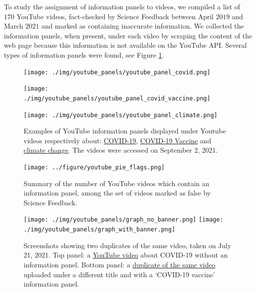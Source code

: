 \documentclass[Afour,sageh,times]{sagej}
\begin{document}
To study the assignment of information panels to videos, we compiled a list of $170$ YouTube videos, fact-checked by Science Feedback between April $2019$ and March $2021$ and marked as containing inaccurate information. 
We collected the information panels, when present, under each video by scraping the content of the web page because this information is not available on the YouTube API. 
Several types of information panels were found, see Figure \ref{youtube_panel_screenshots}.

\begin{figure}[h]
	\centering
		\texttt{[image: ./img/youtube\_panels/youtube\_panel\_covid.png]} \vspace{0.3cm}
		
		\texttt{[image: ./img/youtube\_panels/youtube\_panel\_covid\_vaccine.png]} 
		\vspace{0.3cm}
		
		\texttt{[image: ./img/youtube\_panels/youtube\_panel\_climate.png]}
	\caption{Examples of YouTube information panels displayed under Youtube videos respectively about: \href{https://www.youtube.com/watch?v=O1cFVdC2rZQ}{COVID-19}, \href{https://www.youtube.com/watch?v=v0-6JTr2Ifo}{COVID-19 Vaccine} and \href{https://www.youtube.com/watch?v=4U8kgiiVj5Q}{climate change}. The videos were accessed on September 2, 2021.}
	\label{youtube_panel_screenshots}
\end{figure}

\begin{figure}[h]
	\centering
		\texttt{[image: ../figure/youtube\_pie\_flags.png]}
		\caption{Summary of the number of YouTube videos which contain an information panel, among the set of videos marked as false by Science Feedback.}
\label{youtube_panel_proportions}
\end{figure}

\begin{figure}[h]
	\centering
		\texttt{[image: ./img/youtube\_panels/graph\_no\_banner.png]}
		\vspace{0.4cm}
		\texttt{[image: ./img/youtube\_panels/graph\_with\_banner.png]} 
	\caption{Screenshots showing two duplicates of the same video, taken on July 21, 2021. 
Top panel: a \href{https://www.youtube.com/watch?v=d9GbVZOcT18}{YouTube video} about COVID-19 without an information panel. 	
Bottom panel: a \href{https://www.youtube.com/watch?v=A4RvrEKoNxc}{duplicate of the same video} uploaded under a different title and with a `COVID-19 vaccine' information panel.}
	\label{duplicates_yt}
\end{figure}
\end{document}
